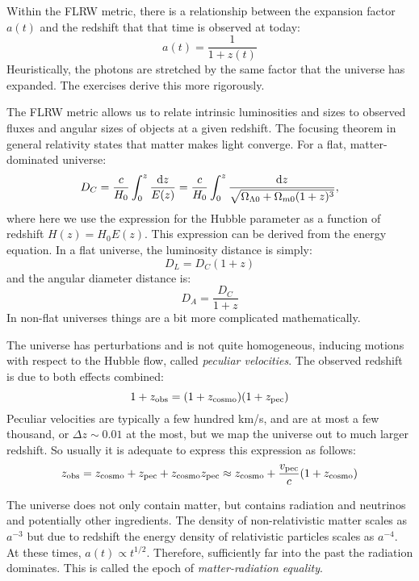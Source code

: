Within the FLRW metric, there is a relationship between the expansion
factor $a(t)$ and the redshift that that time is observed at today:
\begin{equation}
a(t) = \frac{1}{1+z(t)}
\end{equation}
Heuristically, the photons are stretched by the same factor that the
universe has expanded. The exercises derive this more rigorously. 

The FLRW metric allows us to relate intrinsic luminosities and sizes
to observed fluxes and angular sizes of objects at a given
redshift. The focusing theorem in general relativity states that
matter makes light converge. For a flat, matter-dominated universe:
\begin{equation}
D_C= 
\frac{c}{H_0} \int_0^z \frac{{\rm d}z}{E(z)}
= 
\frac{c}{H_0} \int_0^z \frac{{\rm d}z}{\sqrt{\Omega_{\Lambda0} +
    \Omega_{m0}(1+z)^3}},
\end{equation}
where here we use the expression for the Hubble parameter as a
function of redshift $H(z) = H_0 E(z)$.  This expression can be
derived from the energy equation. In a flat universe, the luminosity
distance is simply:
\begin{equation}
D_L = D_C (1+z)
\end{equation}
and the angular diameter distance is:
\begin{equation}
D_A = \frac{D_C}{1+z}
\end{equation}
In non-flat universes things are a bit more complicated
mathematically.

The universe has perturbations and is not quite homogeneous, inducing
motions with respect to the Hubble flow, called {\it peculiar
velocities}.  The observed redshift is due to both effects combined:
\begin{equation}
1+z_{\rm obs} = (1+z_{\rm cosmo})(1+z_{\rm pec})
\end{equation}
Peculiar velocities are typically a few hundred km/s, and are at most
a few thousand, or $\Delta z \sim 0.01$ at the most, but we map the
universe out to much larger redshift. So usually it is adequate to
express this expression as follows:
\begin{equation}
z_{\rm obs} = z_{\rm cosmo}+z_{\rm pec} + z_{\rm cosmo}z_{\rm pec}
\approx z_{\rm cosmo} + \frac{v_{\rm pec}}{c} (1+z_{\rm cosmo})
\end{equation}

The universe does not only contain matter, but contains radiation and
neutrinos and potentially other ingredients.  The density of
non-relativistic matter scales as $a^{-3}$ but due to redshift the
energy density of relativistic particles scales as $a^{-4}$. At these
times, $a(t)\propto t^{1/2}$. Therefore, sufficiently far into the
past the radiation dominates. This is called the epoch of {\it
matter-radiation equality}.

